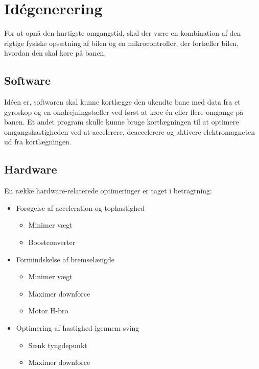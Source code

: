 
\newpage
\section{Idégenerering}
\label{idegen}
For at opnå den hurtigste omgangstid, skal der være en kombination af den rigtige fysiske opsætning af bilen og en mikrocontroller, der fortæller bilen, hvordan den skal køre på banen.

\subsection{Software}
Idéen er, softwaren skal kunne kortlægge den ukendte bane med data fra et gyroskop og en omdrejningstæller ved først at køre én eller flere omgange på banen.
Et andet program skulle kunne bruge kortlægningen til at optimere omgangshastigheden ved at accelerere, deaccelerere og aktivere elektromagneten ud fra kortlægningen.

\subsection{Hardware}
En række hardware-relaterede optimeringer er taget i betragtning:
\begin{itemize}
\item Forøgelse af acceleration og tophastighed
	\begin{itemize}
		\item Minimer vægt
		\item Boostconverter
	\end{itemize}
\item Formindskelse af bremselængde
	\begin{itemize}
		\item Minimer vægt
		\item Maximer downforce
		\item Motor H-bro
	\end{itemize}
\item Optimering af hastighed igennem sving
	\begin{itemize}
		\item Sænk tyngdepunkt
		\item Maximer downforce
	\end{itemize}
\end{itemize}
